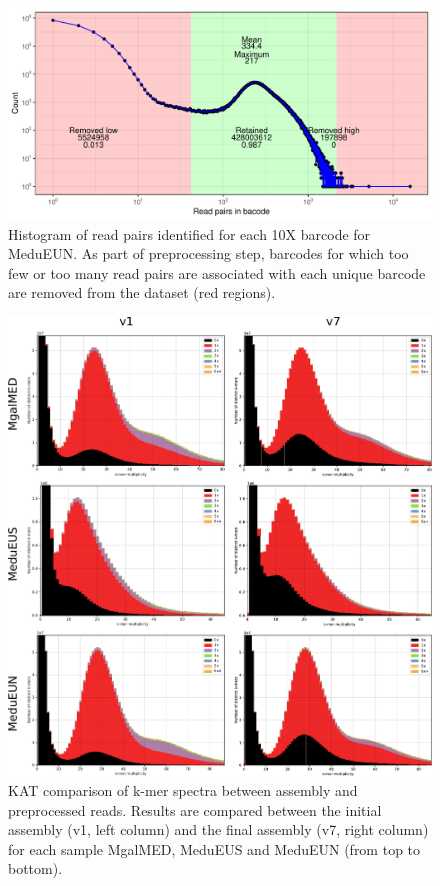 \documentclass[11pt, a4paper]{article}
\begin{document}
\begin{figure}[h]
	\includegraphics[width=\linewidth]{figures/supfig_MeduEUN_preproc_barcode_filt.pdf}
	\caption{Histogram of read pairs identified for each 10X barcode for MeduEUN.
	As part of preprocessing step, barcodes for which too few or too many read pairs are associated with each unique barcode are removed from the dataset (red regions).}
	\label{supfig:preproc_MeduEUN}
\end{figure}

\begin{figure}[h]
	\includegraphics[width=\linewidth]{figures/supfig_kat_spectra.pdf}
	\caption{KAT comparison of k-mer spectra between assembly and preprocessed reads.
	Results are compared between the initial assembly (v1, left column) and the final assembly (v7, right column) for each sample MgalMED, MeduEUS and MeduEUN (from top to bottom).}
	\label{supfig:kat_spectra}
\end{figure}
\end{document}
